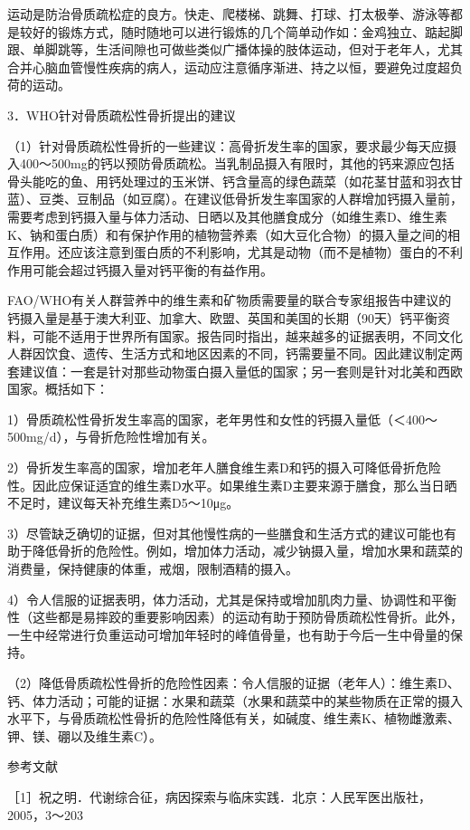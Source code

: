 运动是防治骨质疏松症的良方。快走、爬楼梯、跳舞、打球、打太极拳、游泳等都是较好的锻炼方式，随时随地可以进行锻炼的几个简单动作如：金鸡独立、踮起脚跟、单脚跳等，生活间隙也可做些类似广播体操的肢体运动，但对于老年人，尤其合并心脑血管慢性疾病的病人，运动应注意循序渐进、持之以恒，要避免过度超负荷的运动。

{3．WHO针对骨质疏松性骨折提出的建议}

（1）针对骨质疏松性骨折的一些建议：高骨折发生率的国家，要求最少每天应摄入400～500mg的钙以预防骨质疏松。当乳制品摄入有限时，其他的钙来源应包括骨头能吃的鱼、用钙处理过的玉米饼、钙含量高的绿色蔬菜（如花茎甘蓝和羽衣甘蓝）、豆类、豆制品（如豆腐）。在建议低骨折发生率国家的人群增加钙摄入量前，需要考虑到钙摄入量与体力活动、日晒以及其他膳食成分（如维生素D、维生素K、钠和蛋白质）和有保护作用的植物营养素（如大豆化合物）的摄入量之间的相互作用。还应该注意到蛋白质的不利影响，尤其是动物（而不是植物）蛋白的不利作用可能会超过钙摄入量对钙平衡的有益作用。

FAO/WHO有关人群营养中的维生素和矿物质需要量的联合专家组报告中建议的钙摄入量是基于澳大利亚、加拿大、欧盟、英国和美国的长期（90天）钙平衡资料，可能不适用于世界所有国家。报告同时指出，越来越多的证据表明，不同文化人群因饮食、遗传、生活方式和地区因素的不同，钙需要量不同。因此建议制定两套建议值：一套是针对那些动物蛋白摄入量低的国家；另一套则是针对北美和西欧国家。概括如下：

1）骨质疏松性骨折发生率高的国家，老年男性和女性的钙摄入量低（＜400～500mg/d），与骨折危险性增加有关。

2）骨折发生率高的国家，增加老年人膳食维生素D和钙的摄入可降低骨折危险性。因此应保证适宜的维生素D水平。如果维生素D主要来源于膳食，那么当日晒不足时，建议每天补充维生素D5～10μg。

3）尽管缺乏确切的证据，但对其他慢性病的一些膳食和生活方式的建议可能也有助于降低骨折的危险性。例如，增加体力活动，减少钠摄入量，增加水果和蔬菜的消费量，保持健康的体重，戒烟，限制酒精的摄入。

4）令人信服的证据表明，体力活动，尤其是保持或增加肌肉力量、协调性和平衡性（这些都是易摔跤的重要影响因素）的运动有助于预防骨质疏松性骨折。此外，一生中经常进行负重运动可增加年轻时的峰值骨量，也有助于今后一生中骨量的保持。

（2）降低骨质疏松性骨折的危险性因素：令人信服的证据（老年人）：维生素D、钙、体力活动；可能的证据：水果和蔬菜（水果和蔬菜中的某些物质在正常的摄入水平下，与骨质疏松性骨折的危险性降低有关，如碱度、维生素K、植物雌激素、钾、镁、硼以及维生素C）。

{参考文献}

［1］祝之明．代谢综合征，病因探索与临床实践．北京：人民军医出版社，2005，3～203

